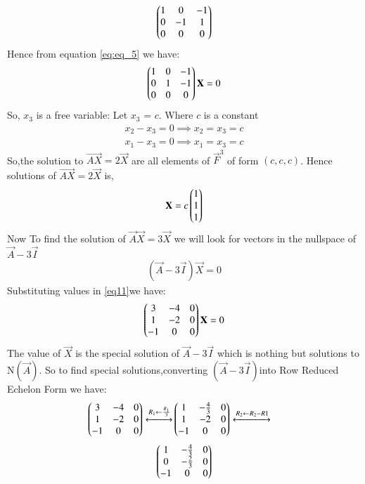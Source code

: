 \documentclass[journal,12pt,twocolumn]{IEEEtran}
\begin{document}
\begin{flushleft}
\begin{align} \label{eq:eq_5}
    \begin{pmatrix}1&0&-1\\
    0&-1&1\\
    0&0&0\end{pmatrix} 
\end{align}
Hence from equation \eqref{eq:eq_5} we have:
\begin{align}
\begin{pmatrix}1&0&-1\\
0&1&-1\\
0&0&0
\end{pmatrix}
\mathbf{X}=0
\end{align}
So, $x_3$ is a free variable: Let $x_3$ = $c$. Where $c$ is a constant
\begin{align}
 {x_2}-{x_3}=0 \implies{x_2}={x_3}=c \\
 {x_1}-{x_3}=0 \implies{x_1}={x_3}=c 
 \end{align}
 So,the solution to $\vec{AX} =2\vec{X}$ are all elements of $\vec{F}^3$ of form $(c,c,c)$. 
 Hence solutions of
 $\vec{AX}=2\vec{X}$ is,
 \begin{align}
 \mathbf{X} = 
 c
 \begin{pmatrix}
 1\\1\\1
 \end{pmatrix}
\end{align}
 Now To find the solution of $\vec{A}\vec{X}=3\vec{X}$ we will look for vectors in the nullspace of $\vec{A}-3\vec{I}$ 
 \begin{align}\label{eq11}
(\vec{A}-3\vec{I})\vec X=0
\end{align}
Substituting values in \eqref{eq11}we have:
\begin{align}
\begin{pmatrix}3&-4&0\\
1&-2&0\\
-1&0&0
\end{pmatrix}\mathbf X=0
\end{align} 
The value of $\vec X$ is the special solution of $\vec A-3\vec I$ which is nothing but solutions to N$(\vec{A})$.
So to find special solutions,converting $(\vec A-3\vec I)$into
Row Reduced Echelon Form we have:
\begin{align}
\begin{pmatrix}3& -4&0\\
1 & -2 & 0\\
-1 & 0 &0
\end{pmatrix}
\xleftrightarrow[]{R_1 \leftarrow \frac{R_1}{3} } 
&
\begin{pmatrix}1&-\frac{4}{3}&0\\
1&-2&0\\
-1&0&0\end{pmatrix}
\xleftrightarrow[]{R_2 \leftarrow R_2-R1} \nonumber 
\end{align}
\begin{align}
    \myvec{1&-\frac{4}{3}&0\\
            0&-\frac{2}{3}&0\\
            -1&0&0}

\end{align}
\end{flushleft}
\end{document}
